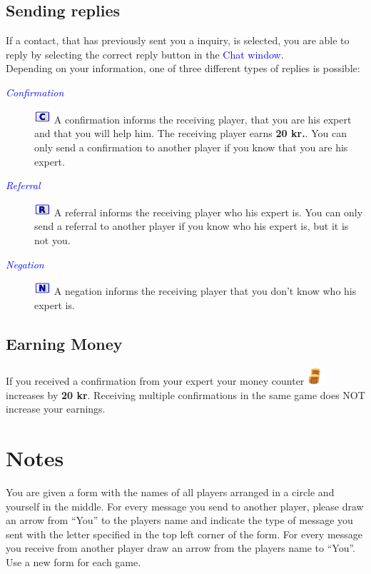 \documentclass[a4paper,10pt]{article}
\newcommand{\ActionR}[0]{\action{blue}{Referral} }
\newcommand{\ActionC}[0]{\action{blue}{Confirmation} }
\newcommand{\ActionN}[0]{\action{blue}{Negation} }
\newcommand{\action}[2]{\textcolor{#1}{\emph{{#2}}}}
\newcommand{\Money}[1]{\textcolor[rgb]{0.7,0.7,0}{\textbf{{#1}}}}
\begin{document}
 \subsection{Sending replies}
 If a contact, that has previously sent you a inquiry, is selected, you are able to reply by selecting the correct reply button in the \textcolor{blue}{Chat window}. \\
 Depending on your information, one of three different types of replies is possible:
   \begin{description}
  \item[\ActionC] \includegraphics[width=0.05\textwidth]{Confirm.pdf} A confirmation informs the receiving player, that you are his expert and that you will help him. The receiving player earns \Money{20 kr.}. You can only send a confirmation to another player if you know that you are his expert.
 \item[\ActionR] \includegraphics[width=0.05\textwidth]{Refer.pdf} A referral informs the receiving player who his expert is. You can only send a referral to another player if you know who his expert is, but it is not you.
 \item[\ActionN] \includegraphics[width=0.05\textwidth]{Negate.pdf} A negation informs the receiving player that you don't know who his expert is.
 \end{description}
 
 \subsection{Earning Money}
If you received a confirmation from your expert your money counter \includegraphics[width=0.05\textwidth]{Money.pdf} increases by \Money{20 kr}. Receiving multiple confirmations in the same game does NOT increase your earnings.    
   \section{Notes}
 You are given a form with the names of all players arranged in a circle and yourself in the middle. For every message you send to another player, please draw an arrow from ``You'' to the players name and indicate the type of message you sent with the letter specified in the top left corner of the form. For every message you receive from another player draw an arrow from the players name to ``You''. Use a new form for each game.
 
 
  
\end{document}
